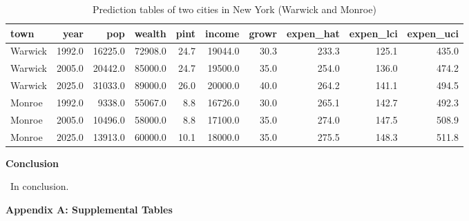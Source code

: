 \documentclass[11pt]{article}\usepackage[]{graphicx}\usepackage[]{color}
\begin{document}
\begin{center}
\begin{table}[ht]
\centering
\begin{tabular}{lrrrrrrrrr}
  \hline
town & year & pop & wealth & pint & income & growr & expen\_hat & expen\_lci & expen\_uci \\ 
  \hline
Warwick & 1992.0 & 16225.0 & 72908.0 & 24.7 & 19044.0 & 30.3 & 233.3 & 125.1 & 435.0 \\ 
  Warwick & 2005.0 & 20442.0 & 85000.0 & 24.7 & 19500.0 & 35.0 & 254.0 & 136.0 & 474.2 \\ 
  Warwick & 2025.0 & 31033.0 & 89000.0 & 26.0 & 20000.0 & 40.0 & 264.2 & 141.1 & 494.5 \\ 
  Monroe & 1992.0 & 9338.0 & 55067.0 & 8.8 & 16726.0 & 30.0 & 265.1 & 142.7 & 492.3 \\ 
  Monroe & 2005.0 & 10496.0 & 58000.0 & 8.8 & 17100.0 & 35.0 & 274.0 & 147.5 & 508.9 \\ 
  Monroe & 2025.0 & 13913.0 & 60000.0 & 10.1 & 18000.0 & 35.0 & 275.5 & 148.3 & 511.8 \\ 
   \hline
\end{tabular}
\caption{Prediction tables of two cities in New York (Warwick and Monroe)} 
\label{pred_tab}
\end{table}

\end{center}

\noindent\textbf{Conclusion}

\noindent\ In conclusion.
\hfill \break


\clearpage
\newpage
\noindent \Large{{\bf Appendix A: Supplemental Tables}}
\end{document}
